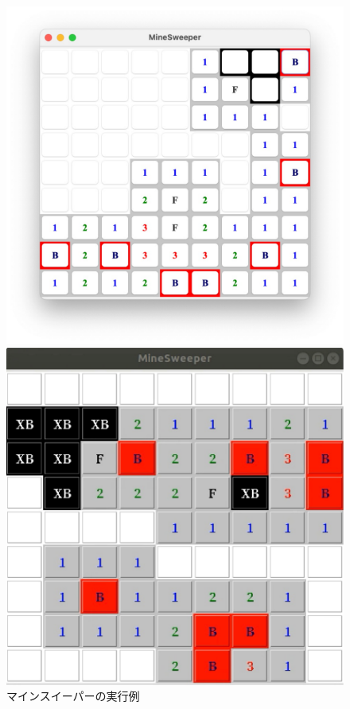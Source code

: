 \documentclass[a4j,11pt]{jsarticle}
\begin{document}
\begin{figure}[h]
    \centering
    \caption{マインスイーパーの実行例}
    \label{fig:マインスイーパーの実行例}
    \begin{minipage}[t]{0.45\linewidth}
        \centering
        \includegraphics[scale=0.3]{fig1.pdf}
    \end{minipage}
    \begin{minipage}[t]{0.45\linewidth}
        \centering
        \includegraphics[scale=0.3]{fig2.pdf}
    \end{minipage}
\end{figure}
\end{document}
